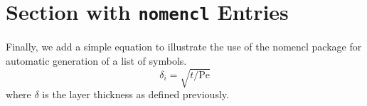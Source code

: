 \section{Section with \texttt{nomencl} Entries}

Finally, we add a simple equation to illustrate the use of the nomencl
 package for automatic generation of a list of symbols.
\begin{equation}
\delta_i = \sqrt{t/\mathrm{Pe}}
\end{equation}
where $\delta$ is the layer
thickness %
%
%
%
as defined previously. \lipsum[26-30]

\endinput
